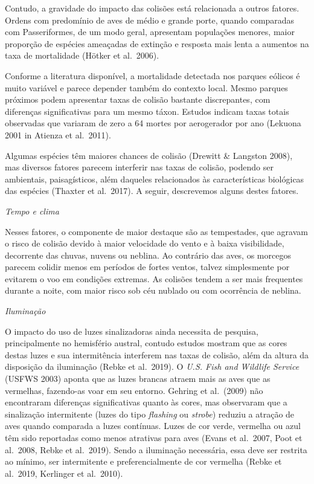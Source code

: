 \documentclass[
  oneside]{scrbook}
\begin{document}
Contudo, a gravidade do impacto das colisões está relacionada a outros fatores. Ordens com predomínio de aves de médio e grande porte, quando comparadas com Passeriformes, de um modo geral, apresentam populações menores, maior proporção de espécies ameaçadas de extinção e resposta mais lenta a aumentos na taxa de mortalidade (Hötker et al.~2006).

Conforme a literatura disponível, a mortalidade detectada nos parques eólicos é muito variável e parece depender também do contexto local. Mesmo parques próximos podem apresentar taxas de colisão bastante discrepantes, com diferenças significativas para um mesmo táxon. Estudos indicam taxas totais observadas que variaram de zero a 64 mortes por aerogerador por ano (Lekuona 2001 in Atienza et al.~2011).

Algumas espécies têm maiores chances de colisão (Drewitt \& Langston 2008), mas diversos fatores parecem interferir nas taxas de colisão, podendo ser ambientais, paisagísticos, além daqueles relacionados às características biológicas das espécies (Thaxter et al.~2017). A seguir, descrevemos alguns destes fatores.

\emph{Tempo e clima}

Nesses fatores, o componente de maior destaque são as tempestades, que agravam o risco de colisão devido à maior velocidade do vento e à baixa visibilidade, decorrente das chuvas, nuvens ou neblina. Ao contrário das aves, os morcegos parecem colidir menos em períodos de fortes ventos, talvez simplesmente por evitarem o voo em condições extremas. As colisões tendem a ser mais frequentes durante a noite, com maior risco sob céu nublado ou com ocorrência de neblina.

\emph{Iluminação}

O impacto do uso de luzes sinalizadoras ainda necessita de pesquisa, principalmente no hemisfério austral, contudo estudos mostram que as cores destas luzes e sua intermitência interferem nas taxas de colisão, além da altura da disposição da iluminação (Rebke et al.~2019). O \emph{U.S. Fish and Wildlife Service} (USFWS 2003) aponta que as luzes brancas atraem mais as aves que as vermelhas, fazendo-as voar em seu entorno. Gehring et al.~(2009) não encontraram diferenças significativas quanto às cores, mas observaram que a sinalização intermitente (luzes do tipo \emph{flashing} ou \emph{strobe}) reduziu a atração de aves quando comparada a luzes contínuas. Luzes de cor verde, vermelha ou azul têm sido reportadas como menos atrativas para aves (Evans et al.~2007, Poot et al.~2008, Rebke et al.~2019). Sendo a iluminação necessária, essa deve ser restrita ao mínimo, ser intermitente e preferencialmente de cor vermelha (Rebke et al.~2019, Kerlinger et al.~2010).
\end{document}
